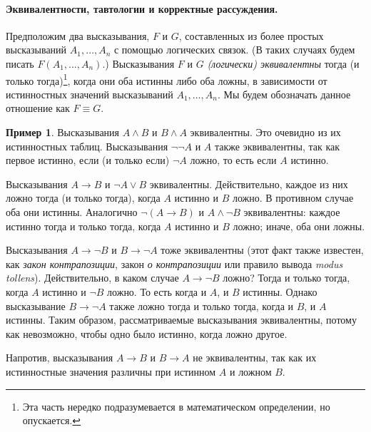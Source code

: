 \documentclass[12pt,notitlepage]{article}
\theoremstyle{plain}
\theoremstyle{definition}
\newtheorem{exm}[thm]{Пример}
\theoremstyle{plain}
\newcommand{\1}{\mathbf{1}}
\newcommand{\0}{\mathbf{0}}
\newcommand{\mcomm}[1]{}
\begin{document}
\paragraph{Эквивалентности, тавтологии и корректные рассуждения.} Предположим два высказывания, $F$ и $G$, составленных из более простых высказываний $A_1,\ldots,A_n$ с помощью логических связок. (В таких случаях будем писать $F(A_1,\ldots,A_n)$.) Высказывания $F$ и $G$ \emph{(логически) эквивалентны} тогда (и только тогда)\footnote{Эта часть нередко подразумевается в математическом определении, но опускается.}, когда они оба истинны либо оба ложны, в зависимости от истинностных значений высказываний $A_1,\ldots, A_n$. Мы будем обозначать данное отношение как $F \equiv G$.
\begin{exm}
	Высказывания $A \wedge B$ и $B \wedge A$ эквивалентны. Это очевидно из их истинностных таблиц. Высказывания $\neg \neg A$ и $A$ также эквивалентны, так как первое истинно, если (и только если) $\neg A$ ложно, то есть если $A$ истинно. 
	
	Высказывания $A \to B$ и $\neg A \vee B$ эквивалентны. Действительно, каждое из них ложно тогда (и только тогда), когда $A$ истинно и $B$ ложно. В противном случае оба они истинны. Аналогично $\neg(A \to B)$ и $A \wedge \neg B$ эквивалентны: каждое истинно тогда и только тогда, когда $A$ истинно и $B$ ложно; иначе, оба они ложны.
	
	Высказывания $A \to \neg B$ и $B \to \neg A$ тоже эквивалентны (этот факт также известен, как \emph{закон контрапозиции}, закон \emph{о контрапозиции} или правило вывода \emph{modus tollens}). Действительно, в каком случае $A \to \neg B$ ложно? Тогда и только тогда, когда $A$ истинно и $\neg B$ ложно. То есть когда и $A$, и $B$ истинны. Однако высказывание $B \to \neg A$ также ложно тогда и только тогда, когда и $B$, и $A$ истинны. Таким образом, рассматриваемые высказывания эквивалентны, потому как невозможно, чтобы одно было истинно, когда ложно другое.
	
	
	
	Напротив, высказывания $A \to B$ и $B \to A$ не эквивалентны, так как их истинностные значения различны при истинном $A$ и ложном $B$.
\end{exm}
\mcomm{}
\end{document}
